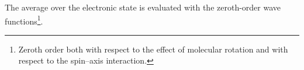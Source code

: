 The average over the electronic state is evaluated with the zeroth-order wave functions\footnote{Zeroth order both with respect to the effect of molecular rotation and with respect to the spin--axis interaction.}.
